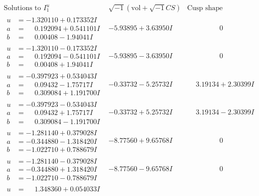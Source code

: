 \documentclass[1p]{elsarticle_modified}
\theoremstyle{definition}
\newcommand{\I}{\sqrt{-1}}
\begin{document}
$$\begin{array}{c|c|c}
\text{Solutions to }I^u_{1}& \I (\text{vol} + \sqrt{-1}CS) & \text{Cusp shape}\\
 \hline 
\begin{aligned}
u &= -1.320110 + 0.173352 I \\
a &= \phantom{-}0.192094 + 0.541101 I \\
b &= \phantom{-}0.00408 - 1.94041 I\end{aligned}
 & -5.93895 + 3.63950 I & \phantom{-0.000000 } 0 \\ \hline\begin{aligned}
u &= -1.320110 - 0.173352 I \\
a &= \phantom{-}0.192094 - 0.541101 I \\
b &= \phantom{-}0.00408 + 1.94041 I\end{aligned}
 & -5.93895 - 3.63950 I & \phantom{-0.000000 } 0 \\ \hline\begin{aligned}
u &= -0.397923 + 0.534043 I \\
a &= \phantom{-}0.09432 - 1.75717 I \\
b &= \phantom{-}0.309084 + 1.191700 I\end{aligned}
 & -0.33732 - 5.25732 I & \phantom{-}3.19134 + 2.30399 I \\ \hline\begin{aligned}
u &= -0.397923 - 0.534043 I \\
a &= \phantom{-}0.09432 + 1.75717 I \\
b &= \phantom{-}0.309084 - 1.191700 I\end{aligned}
 & -0.33732 + 5.25732 I & \phantom{-}3.19134 - 2.30399 I \\ \hline\begin{aligned}
u &= -1.281140 + 0.379028 I \\
a &= -0.344880 - 1.318420 I \\
b &= -1.022710 + 0.788679 I\end{aligned}
 & -8.77560 + 9.65768 I & \phantom{-0.000000 } 0 \\ \hline\begin{aligned}
u &= -1.281140 - 0.379028 I \\
a &= -0.344880 + 1.318420 I \\
b &= -1.022710 - 0.788679 I\end{aligned}
 & -8.77560 - 9.65768 I & \phantom{-0.000000 } 0 \\ \hline\begin{aligned}
u &= \phantom{-}1.348360 + 0.054033 I \\

\end{aligned}
\end{array}$$
\end{document}
